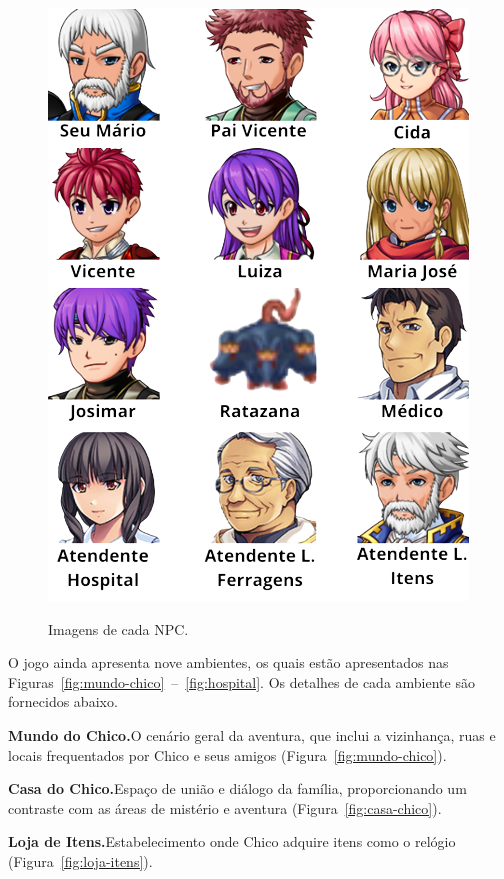 \begin{figure}[ht]
	\centering
	\caption{Imagens de cada NPC.}
	\includegraphics[scale=1.0]{Textuais/Pictures/NPC-Todos.png}
	\label{fig:npcs}
\end{figure}

\newpage

\bigskip\medskip
O jogo ainda apresenta nove ambientes, os quais estão apresentados nas Figuras~\ref{fig:mundo-chico}~--~\ref{fig:hospital}. Os detalhes de cada ambiente são fornecidos abaixo.

\medskip\noindent \textbf{Mundo do Chico.}\quad O cenário geral da aventura, que inclui a vizinhança, ruas e locais frequentados por Chico e seus amigos (Figura~\ref{fig:mundo-chico}).

\medskip\noindent \textbf{Casa do Chico.}\quad Espaço de união e diálogo da família, proporcionando um contraste com as áreas de mistério e aventura (Figura~\ref{fig:casa-chico}).

\medskip\noindent \textbf{Loja de Itens.}\quad Estabelecimento onde Chico adquire itens como o relógio (Figura~\ref{fig:loja-itens}).

